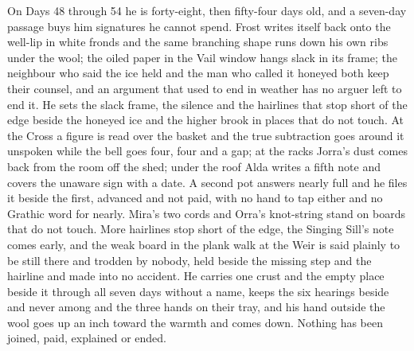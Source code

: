 \documentclass{design/chronicle}
\begin{document}
{On Days 48 through 54 he is forty-eight, then fifty-four days old, and a seven-day passage buys him signatures he cannot spend. Frost writes itself back onto the well-lip in white fronds and the same branching shape runs down his own ribs under the wool; the oiled paper in the Vail window hangs slack in its frame; the neighbour who said the ice held and the man who called it honeyed both keep their counsel, and an argument that used to end in weather has no arguer left to end it. He sets the slack frame, the silence and the hairlines that stop short of the edge beside the honeyed ice and the higher brook in places that do not touch. At the Cross a figure is read over the basket and the true subtraction goes around it unspoken while the bell goes four, four and a gap; at the racks Jorra’s dust comes back from the room off the shed; under the roof Alda writes a fifth note and covers the unaware sign with a date. A second pot answers nearly full and he files it beside the first, advanced and not paid, with no hand to tap either and no Grathic word for nearly. Mira’s two cords and Orra’s knot-string stand on boards that do not touch. More hairlines stop short of the edge, the Singing Sill’s note comes early, and the weak board in the plank walk at the Weir is said plainly to be still there and trodden by nobody, held beside the missing step and the hairline and made into no accident. He carries one crust and the empty place beside it through all seven days without a name, keeps the six hearings beside and never among and the three hands on their tray, and his hand outside the wool goes up an inch toward the warmth and comes down. Nothing has been joined, paid, explained or ended.

}
\end{document}
